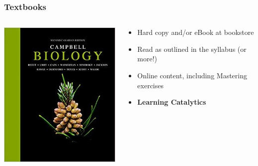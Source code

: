 \documentclass[10pt]{beamer}
\begin{document}
\begin{frame}
\frametitle{Textbooks}

	\begin{columns}
		\begin{column}{0.3\textwidth}
			\begin{center}
				\includegraphics[width=1.0\textwidth]{figures/campbell.jpg}
			\end{center}	
		\end{column}
		
		\begin{column}{0.7\textwidth}
			\begin{itemize}
				\item Hard copy and/or eBook at bookstore
				\bigskip
				\item Read as outlined in the syllabus (or more!)
				\bigskip
				\item Online content, including Mastering exercises
				\bigskip
				\item \textbf{Learning Catalytics}
			\end{itemize}
		\end{column}
	\end{columns}
\end{frame}
\end{document}
